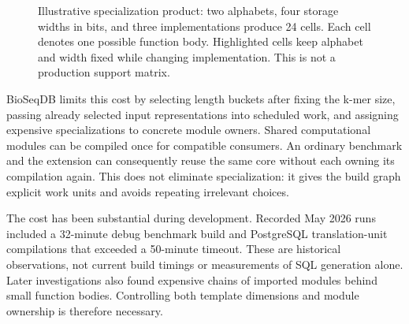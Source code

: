 \begin{figure}[htbp]
\centering
{}
\caption{Illustrative specialization product: two alphabets, four storage
widths in bits, and three implementations produce 24 cells. Each cell denotes
one possible function body. Highlighted cells keep alphabet and width fixed
while changing implementation. This is not a production support matrix.}
\label{fig:arch-template-product}
\end{figure}

BioSeqDB limits this cost by selecting length buckets after fixing the k-mer
size, passing already selected input representations into scheduled work, and assigning
expensive specializations to concrete module owners. Shared computational
modules can be compiled once for compatible consumers. An ordinary benchmark
and the extension can consequently reuse the same core without each owning
its compilation again. This does not eliminate specialization: it gives the
build graph explicit work units and avoids repeating irrelevant choices.

The cost has been substantial during development. Recorded May 2026 runs
included a 32-minute debug benchmark build and PostgreSQL translation-unit
compilations that exceeded a 50-minute timeout. These are historical
observations, not current build timings or measurements of SQL generation
alone. Later investigations also found expensive chains of imported modules
behind small function bodies. Controlling both template dimensions and module
ownership is therefore necessary.

